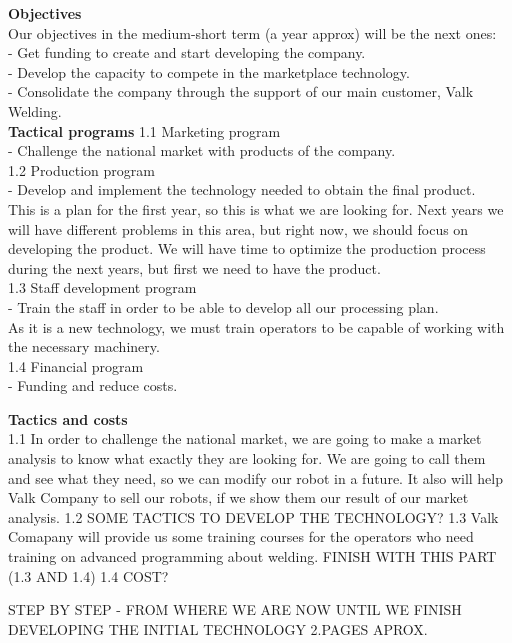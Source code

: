\textbf{Objectives}\\
Our objectives in the medium-short term (a year approx) will be the next ones:\\
	- Get funding to create and start developing the company.\\
	- Develop the capacity to compete in the marketplace technology.\\
	- Consolidate the company through the support of our main customer, Valk Welding.\\
\textbf{Tactical programs}
1.1 Marketing program\\
	- Challenge the national market with products of the company.\\
1.2 Production program\\
	- Develop and implement the technology needed to obtain the final product.\\
	This is a plan for the first year, so this is what we are looking for. Next years we will have different problems in this 	   area, but right now, we should focus on developing the product. We will have time to optimize the production process during the next years, but first we need to have the product.\\
1.3 Staff development program\\
	- Train the staff in order to be able to develop all our processing plan.\\
	As it is a new technology, we must train operators to be capable of working with the necessary machinery.\\
1.4 Financial program\\
	- Funding and reduce costs.

\textbf{Tactics and costs}\\
1.1 In order to challenge the national market, we are going to make a market analysis to know what exactly they are looking for. We are going to call them and see what they need, so we can modify our robot in a future. It also will help Valk Company to sell our robots, if we show them our result of our market analysis.
1.2 SOME TACTICS TO DEVELOP THE TECHNOLOGY?
1.3 Valk Comapany will provide us some training courses for the operators who need training on advanced programming about welding. FINISH WITH THIS PART (1.3 AND 1.4)
1.4 
COST?	

STEP BY STEP - FROM WHERE WE ARE NOW UNTIL WE FINISH DEVELOPING THE INITIAL TECHNOLOGY 2.PAGES APROX.
